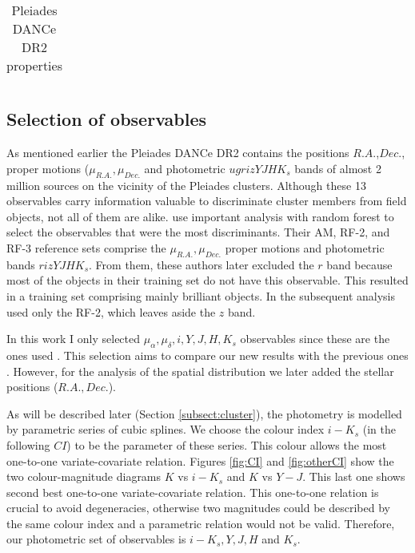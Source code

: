\begin{table}[htdp]
\caption{Pleiades DANCe DR2 properties}
\begin{center}
\begin{tabular}{|c|c|}

\end{tabular}
\end{center}
\label{tab:DR2Missing}
\end{table}%



\subsection{Selection of observables}
\sloppy
As mentioned earlier the Pleiades DANCe DR2 contains the positions $R.A.$,$Dec.$, proper motions ($\mu_{R.A.},\mu_{Dec.}$ and photometric $ugrizYJHK_s$ bands  of almost 2 million sources on the vicinity of the Pleiades clusters. Although these 13 observables carry information valuable to discriminate cluster members from field objects, not all of them are alike. \citet{Sarro2014} use important analysis with random forest to select the observables that were the most discriminants. Their AM, RF-2, and RF-3 reference sets comprise the $\mu_{R.A.},\mu_{Dec.}$ proper motions and photometric bands $rizYJHK_s$. From them, these authors later excluded the $r$ band because most of the objects in their training set do not have this observable. This resulted in a training set comprising mainly brilliant objects. In the subsequent analysis \citet{Bouy2015} used only the RF-2, which leaves aside the $z$ band.

In this work I only selected $\mu_{\alpha},\mu_{\delta},i,Y,J,H,K_s$ observables since these are the ones used \citet{Bouy2015}. This selection aims to compare our new results with the previous ones \citep{Sarro2014,Bouy2015}. However, for the analysis of the spatial distribution we later added the stellar positions ($R.A., Dec.$).

As will be described later (Section \ref{subsect:cluster}), the photometry is modelled by parametric series of cubic splines. We choose the colour index $i-K_s$ (in the following $CI$) to be the parameter of these series. This colour allows the most one-to-one variate-covariate relation. Figures \ref{fig:CI} and \ref{fig:otherCI} show the two colour-magnitude diagrams $K$ vs $i-K_s$ and $K$ vs $Y-J$. This last one shows second best one-to-one variate-covariate relation. This one-to-one relation is crucial to avoid degeneracies, otherwise two magnitudes could be described by the same colour index and a parametric relation would not be valid. Therefore, our photometric set of observables is $i-K_s, Y,J,H$ and $K_s$. 

